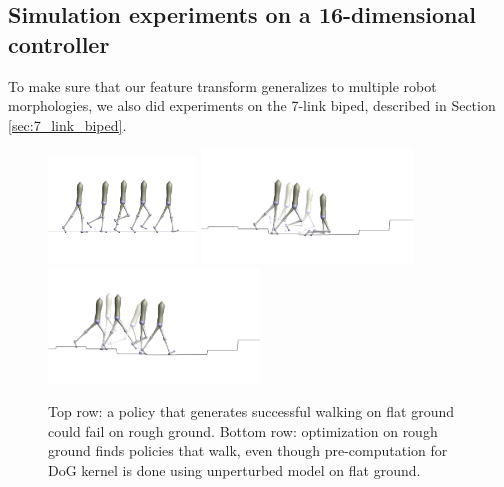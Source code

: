
\subsection{Simulation experiments on a 16-dimensional controller}
\label{sec:7_link_expts}
To make sure that our feature transform generalizes to multiple robot morphologies, we also did experiments on the 7-link biped, described in Section \ref{sec:7_link_biped}.

\begin{figure}[t]
\centering
\includegraphics[width=0.35\textwidth]{img/walk_flat.png}
\hspace{10px}
\vspace{-40px}
\includegraphics[width=0.5\textwidth]{img/rough_fall.png}
\label{fig_bo_locomotion_visualization_rough}
\vspace{30px}
\includegraphics[width=0.5\textwidth]{img/rough_walk.png}
\caption{Top row: a policy that generates successful walking on flat ground could fail on rough ground. Bottom row: optimization on rough ground finds policies that walk, even though pre-computation for DoG kernel is done using unperturbed model on flat ground.}
\label{fig_bo_locomotion_visualization_flat}
\end{figure}

